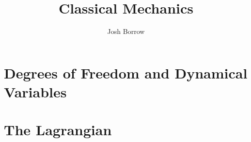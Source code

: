 \documentclass[11pt]{report}
\begin{document}
\title{Classical Mechanics}
\author{Josh Borrow}

\maketitle

\chapter{Degrees of Freedom and Dynamical Variables}




\chapter{The Lagrangian}

\end{document}
